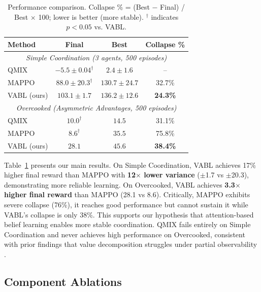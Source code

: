 \documentclass{article}
\theoremstyle{plain}
\theoremstyle{definition}
\theoremstyle{remark}
\begin{document}
\begin{table}[tb]
\centering
\caption{Performance comparison. Collapse \% = (Best $-$ Final) / Best $\times$ 100; lower is better (more stable). $^\dagger$ indicates $p < 0.05$ vs. VABL.}
\label{tab:main_results}
\begingroup
\setlength{\tabcolsep}{3pt}
\renewcommand{\arraystretch}{0.95}
\small
\begin{tabular}{lccc}
\toprule
\textbf{Method} & \textbf{Final} & \textbf{Best} & \textbf{Collapse \%} \\
\midrule
\multicolumn{4}{c}{\textit{Simple Coordination (3 agents, 500 episodes)}} \\
\midrule
QMIX & $-5.5 \pm 0.04^\dagger$ & $2.4 \pm 1.6$ & -- \\
MAPPO & $88.0 \pm 20.3^\dagger$ & $130.7 \pm 24.7$ & 32.7\% \\
VABL (ours) & $\mathbf{103.1 \pm 1.7}$ & $\mathbf{136.2 \pm 12.6}$ & \textbf{24.3\%} \\
\midrule
\multicolumn{4}{c}{\textit{Overcooked (Asymmetric Advantages, 500 episodes)}} \\
\midrule
QMIX & $10.0^\dagger$ & $14.5$ & 31.1\% \\
MAPPO & $8.6^\dagger$ & $35.5$ & 75.8\% \\
VABL (ours) & $\mathbf{28.1}$ & $\mathbf{45.6}$ & \textbf{38.4\%} \\
\bottomrule
\end{tabular}
\endgroup
\end{table}

Table~\ref{tab:main_results} presents our main results. On Simple Coordination, VABL achieves 17\% higher final reward than MAPPO with \textbf{12$\times$ lower variance} ($\pm$1.7 vs $\pm$20.3), demonstrating more reliable learning. On Overcooked, VABL achieves \textbf{3.3$\times$ higher final reward} than MAPPO (28.1 vs 8.6). Critically, MAPPO exhibits severe collapse (76\%), it reaches good performance but cannot sustain it while VABL's collapse is only 38\%. This supports our hypothesis that attention-based belief learning enables more stable coordination. QMIX fails entirely on Simple Coordination and never achieves high performance on Overcooked, consistent with prior findings that value decomposition struggles under partial observability \cite{hu2025adaptability}.

\subsection{Component Ablations}
\end{document}
